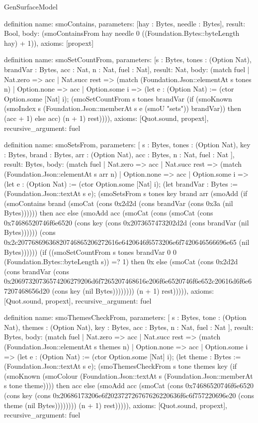 \begin{lexlean}{GenSurfaceModel}
\begin{semanticmodule}
definition{
  name: smoContains,
  parameters: [hay : Bytes, needle : Bytes],
  result: Bool,
  body: (smoContainsFrom hay needle 0 ((Foundation.Bytes::byteLength hay) + 1)),
  axioms: [propext]
}

definition{
  name: smoSetCountFrom,
  parameters: [s : Bytes, tones : (Option Nat), brandVar : Bytes, acc : Nat, n : Nat, fuel : Nat],
  result: Nat,
  body: (match fuel
    | Nat.zero => acc
    | Nat.succ rest => (match (Foundation.Json::elementAt s tones n)
      | Option.none => acc
      | Option.some i => (let e : (Option Nat) := (ctor Option.some [Nat] i); (smoSetCountFrom s tones brandVar (if (smoKnown (smoIndex s (Foundation.Json::memberAt s e (smoU "sets")) brandVar)) then (acc + 1) else acc) (n + 1) rest)))),
  axioms: [Quot.sound, propext],
  recursive_argument: fuel
}

definition{
  name: smoSetsFrom,
  parameters: [
    s : Bytes,
    tones : (Option Nat),
    key : Bytes,
    brand : Bytes,
    arr : (Option Nat),
    acc : Bytes,
    n : Nat,
    fuel : Nat
  ],
  result: Bytes,
  body: (match fuel
    | Nat.zero => acc
    | Nat.succ rest => (match (Foundation.Json::elementAt s arr n)
      | Option.none => acc
      | Option.some i => (let e : (Option Nat) := (ctor Option.some [Nat] i); (let brandVar : Bytes := (Foundation.Json::textAt s e); (smoSetsFrom s tones key brand arr (smoAdd (if (smoContains brand (smoCat (cons 0x2d2d (cons brandVar (cons 0x3a (nil Bytes)))))) then acc else (smoAdd acc (smoCat (cons (smoCat (cons 0x74686520746f6e6520 (cons key (cons 0x2073657473202d2d (cons brandVar (nil Bytes)))))) (cons 0x2c20776869636820746865206272616e6420646f6573206e6f7420646566696e65 (nil Bytes)))))) (if ((smoSetCountFrom s tones brandVar 0 0 (Foundation.Bytes::byteLength s)) =? 1) then 0x else (smoCat (cons 0x2d2d (cons brandVar (cons 0x20697320736574206279206d6f7265207468616e206f6e6520746f6e652c20616d6f6e67207468656d20 (cons key (nil Bytes)))))))) (n + 1) rest))))),
  axioms: [Quot.sound, propext],
  recursive_argument: fuel
}

definition{
  name: smoThemesCheckFrom,
  parameters: [
    s : Bytes,
    tone : (Option Nat),
    themes : (Option Nat),
    key : Bytes,
    acc : Bytes,
    n : Nat,
    fuel : Nat
  ],
  result: Bytes,
  body: (match fuel
    | Nat.zero => acc
    | Nat.succ rest => (match (Foundation.Json::elementAt s themes n)
      | Option.none => acc
      | Option.some i => (let e : (Option Nat) := (ctor Option.some [Nat] i); (let theme : Bytes := (Foundation.Json::textAt s e); (smoThemesCheckFrom s tone themes key (if (smoKnown (smoColour (Foundation.Json::textAt s (Foundation.Json::memberAt s tone theme)))) then acc else (smoAdd acc (smoCat (cons 0x74686520746f6e6520 (cons key (cons 0x20686173206e6f202372726767626220636f6c6f757220696e20 (cons theme (nil Bytes)))))))) (n + 1) rest))))),
  axioms: [Quot.sound, propext],
  recursive_argument: fuel
}


\end{semanticmodule}
\end{lexlean}
